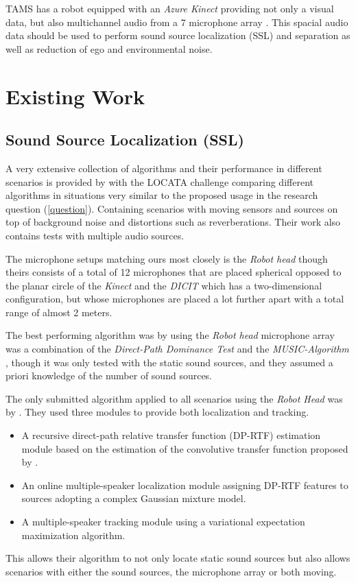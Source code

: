 \documentclass[
    fontsize=12pt,
    headings=small,
    parskip=half,           %
    bibliography=totoc,
    numbers=noenddot,       %
    open=any,               %
      final                   %
]{scrreprt}
\begin{document}
TAMS has a robot equipped with an \emph{Azure Kinect} providing not only a visual data, but also multichannel audio from a 7 microphone array \cite{kinect}. This spacial audio data should be used to perform sound source localization (SSL) and separation as well as reduction of ego and environmental noise.

\chapter{Existing Work}
\label{ew}
\section{Sound Source Localization (SSL)}
\label{ssl}

A very extensive collection of algorithms and their performance in different scenarios is provided by \textcite{LOCATA} with the LOCATA challenge comparing different algorithms in situations very similar to the proposed usage in the research question (\autoref{question}). Containing scenarios with moving sensors and sources on top of background noise and distortions such as reverberations. Their work also contains tests with multiple audio sources.

The microphone setups matching ours most closely is the \emph{Robot head} though theirs consists of a total of 12 microphones that are placed spherical opposed to the planar circle of the \emph{Kinect} and the \emph{DICIT} which has a two-dimensional configuration, but whose microphones are placed a lot further apart with a total range of almost 2 meters.

The best performing algorithm was by \textcite{locata11} using the \emph{Robot head} microphone array was a combination of the \emph{Direct-Path Dominance Test} \cite{dpd} and the \emph{MUSIC-Algorithm} \cite{music}, though it was only tested with the static sound sources, and they assumed a priori knowledge of the number of sound sources.

The only submitted algorithm applied to all scenarios using the \emph{Robot Head} was by \textcite{locata4}. They used three modules to provide both localization and tracking.
\begin{itemize}
    \item A recursive direct-path relative transfer function (DP-RTF) estimation module based on the estimation of the convolutive transfer function proposed by \textcite{estimation_of_dprtf}.
    \item An online multiple-speaker localization module assigning DP-RTF features to sources adopting a complex Gaussian mixture model.
    \item A multiple-speaker tracking module using a variational expectation maximization algorithm.
\end{itemize}
This allows their algorithm to not only locate static sound sources but also allows scenarios with either the sound sources, the microphone array or both moving.
\end{document}
